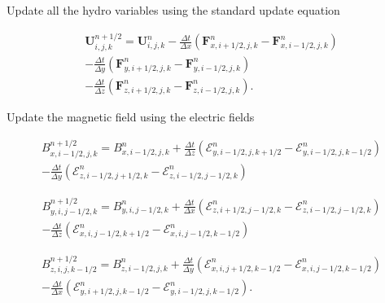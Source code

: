 Update all the hydro variables using the standard update equation

\begin{equation}
    \begin{aligned}
        \boldsymbol{U}^{n+1/2}_{i,j,k} = \boldsymbol{U}^{n}_{i,j,k}
        - \frac{\Delta t}{\Delta x} \left( \boldsymbol{F}^n_{x,i+1/2,j,k} - \boldsymbol{F}^n_{x,i-1/2,j,k} \right) \\
        - \frac{\Delta t}{\Delta y} \left( \boldsymbol{F}^n_{y,i+1/2,j,k} - \boldsymbol{F}^n_{y,i-1/2,j,k} \right) \\
        - \frac{\Delta t}{\Delta z} \left( \boldsymbol{F}^n_{z,i+1/2,j,k} - \boldsymbol{F}^n_{z,i-1/2,j,k} \right).
    \end{aligned}
\end{equation}

Update the magnetic field using the electric fields

\begin{equation}
    \begin{aligned}
        B^{n+1/2}_{x,i-1/2,j,k} = B^{n}_{x,i-1/2,j,k}
        + \frac{\Delta t}{\Delta z} \left( \mathcal{E}^n_{y,i-1/2,j,k+1/2} - \mathcal{E}^n_{y,i-1/2,j,k-1/2} \right) \\
        - \frac{\Delta t}{\Delta y} \left( \mathcal{E}^n_{z,i-1/2,j+1/2,k} - \mathcal{E}^n_{z,i-1/2,j-1/2,k} \right)
    \end{aligned}
\end{equation}

\begin{equation}
    \begin{aligned}
        B^{n+1/2}_{y,i,j-1/2,k} = B^{n}_{y,i,j-1/2,k}
        + \frac{\Delta t}{\Delta x} \left( \mathcal{E}^n_{z,i+1/2,j-1/2,k} - \mathcal{E}^n_{z,i-1/2,j-1/2,k} \right) \\
        - \frac{\Delta t}{\Delta z} \left( \mathcal{E}^n_{x,i,j-1/2,k+1/2} - \mathcal{E}^n_{x,i,j-1/2,k-1/2} \right)
    \end{aligned}
\end{equation}

\begin{equation}
    \begin{aligned}
        B^{n+1/2}_{z,i,j,k-1/2} = B^{n}_{z,i-1/2,j,k}
        + \frac{\Delta t}{\Delta y} \left( \mathcal{E}^n_{x,i,j+1/2,k-1/2} - \mathcal{E}^n_{x,i,j-1/2,k-1/2} \right) \\
        - \frac{\Delta t}{\Delta x} \left( \mathcal{E}^n_{y,i+1/2,j,k-1/2} - \mathcal{E}^n_{y,i-1/2,j,k-1/2} \right).
    \end{aligned}
\end{equation}

